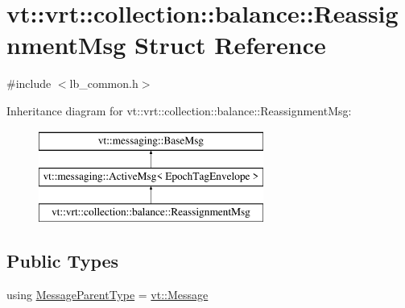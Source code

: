 \hypertarget{structvt_1_1vrt_1_1collection_1_1balance_1_1_reassignment_msg}{}\section{vt\+:\+:vrt\+:\+:collection\+:\+:balance\+:\+:Reassignment\+Msg Struct Reference}
\label{structvt_1_1vrt_1_1collection_1_1balance_1_1_reassignment_msg}


{\ttfamily \#include $<$lb\+\_\+common.\+h$>$}

Inheritance diagram for vt\+:\+:vrt\+:\+:collection\+:\+:balance\+:\+:Reassignment\+Msg\+:\begin{figure}[H]
\begin{center}
\leavevmode
\includegraphics[height=3.000000cm]{structvt_1_1vrt_1_1collection_1_1balance_1_1_reassignment_msg}
\end{center}
\end{figure}
\subsection*{Public Types}
\begin{DoxyCompactItemize}
\item 
using \hyperlink{structvt_1_1vrt_1_1collection_1_1balance_1_1_reassignment_msg_a94241fd5a0c3b245267d2d97f0d4c0e4}{Message\+Parent\+Type} = \hyperlink{namespacevt_a3a3ddfef40b4c90915fa43cdd5f129ea}{vt\+::\+Message}
\end{DoxyCompactItemize}
